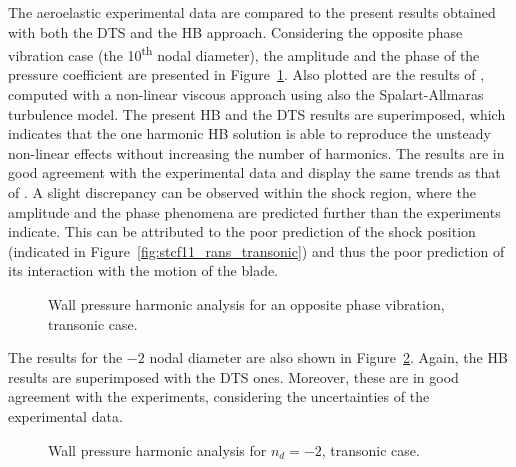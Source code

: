 The aeroelastic experimental data are compared to the present results
obtained with both the DTS and the HB approach.  
Considering the opposite phase vibration case (the 10\textsuperscript{th} nodal diameter), 
the amplitude and the
phase of the pressure coefficient are presented in
Figure~\ref{fig:stcf11_ael_transonic_ibpa_180_paper}. Also plotted are the results of
\citet{Cinnella2004}, computed with a non-linear viscous
approach using also the Spalart-Allmaras turbulence model. The present HB and the DTS
results are superimposed, which indicates that the one harmonic HB solution is able
to reproduce the unsteady non-linear effects without increasing the
number of harmonics. The results are in good agreement with
the experimental data and display the same trends as that of
\citet{Cinnella2004}. A slight discrepancy can be observed within the shock
region, where the amplitude and the phase phenomena are predicted
further than the experiments indicate.  This can be attributed to the poor
prediction of the shock position (indicated in 
Figure~\ref{fig:stcf11_rans_transonic}) and thus the poor prediction
of its interaction with the motion of the blade.
\begin{figure}[htp]
  \centering
  \caption{Wall pressure harmonic analysis for an opposite phase vibration, transonic case.}
  \label{fig:stcf11_ael_transonic_ibpa_180_paper}
\end{figure}

The results for the $-2$ nodal diameter are also shown in
Figure~\ref{fig:stcf11_ael_transonic_ibpa_324_paper}. Again,
the HB results are superimposed with the DTS ones. Moreover, these are in
good agreement with the experiments, considering the uncertainties of
the experimental data.
\begin{figure}[htp]
  \centering
  \caption{Wall pressure harmonic analysis for \mbox{$n_d=-2$}, transonic case.}
  \label{fig:stcf11_ael_transonic_ibpa_324_paper}
\end{figure}

